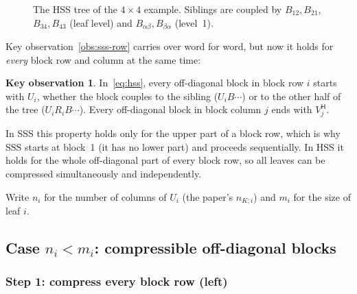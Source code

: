 \documentclass[11pt]{article}
\newcommand{\ct}{^{\mathsf H}}            %
\theoremstyle{definition}
\newtheorem{observation}{Key observation}
\begin{document}
\begin{figure}[!htb]
\centering
{}
\caption{The HSS tree of the $4\times4$ example. Siblings are coupled by
$B_{12},B_{21}$, $B_{34},B_{43}$ (leaf level) and $B_{\alpha\beta},B_{\beta\alpha}$ (level~1).}
\label{fig:tree}
\end{figure}

Key observation~\ref{obs:sss-row} carries over word for word, but now it holds for
\emph{every} block row and column at the same time:
\begin{observation}
\label{obs:hss}
In~\eqref{eq:hss}, every off-diagonal block in block row $i$ starts with $U_i$,
whether the block couples to the sibling ($U_iB\cdots$) or to the other half
of the tree ($U_iR_iB\cdots$). Every off-diagonal block in block column $j$ ends
with $V_j\ct$.
\end{observation}

In SSS this property holds only for the upper part of a block row, which is
why SSS starts at block~1 (it has no lower part) and proceeds sequentially. In
HSS it holds for the whole off-diagonal part of every block row, so all leaves
can be compressed simultaneously and independently.

Write $n_i$ for the number of columns of $U_i$ (the paper's $n_{K;i}$) and $m_i$
for the size of leaf $i$.

\subsection{\texorpdfstring{Case $n_i<m_i$: compressible off-diagonal blocks}{Case ni < mi: compressible off-diagonal blocks}}

\subsubsection*{Step 1: compress every block row (left)}
\end{document}
